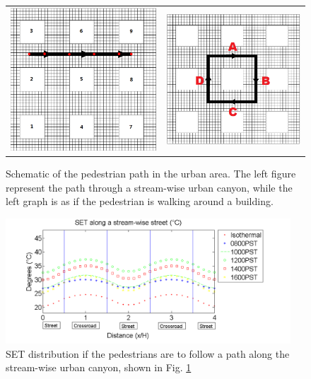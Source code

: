 \documentclass[smallextended]{svjour3}
\begin{document}
\begin{figure}[!h] \centering  
\graphicspath{ {image/} }
\begin{tabular}{cc}
 \includegraphics[width=.35\textwidth]{LineLocation.png}    &
 \includegraphics[width=.35\textwidth]{CircleLocation.png}   
\end{tabular}
\caption{Schematic of the pedestrian path in the urban area. The left figure represent the path through a stream-wise urban canyon, while the left graph is as if the pedestrian is walking around a building.} 
\label{Fig.Paths}
\end{figure}
   \begin{figure}[!h]
\graphicspath{ {image/} }
\centerline{\includegraphics[width=0.95\textwidth]{line.png}}
\caption{SET distribution if the pedestrians are to follow a path along the stream-wise urban canyon, shown in Fig.  \ref{Fig.Paths}}
\label{Fig.LineSum}
\end{figure}
\end{document}
